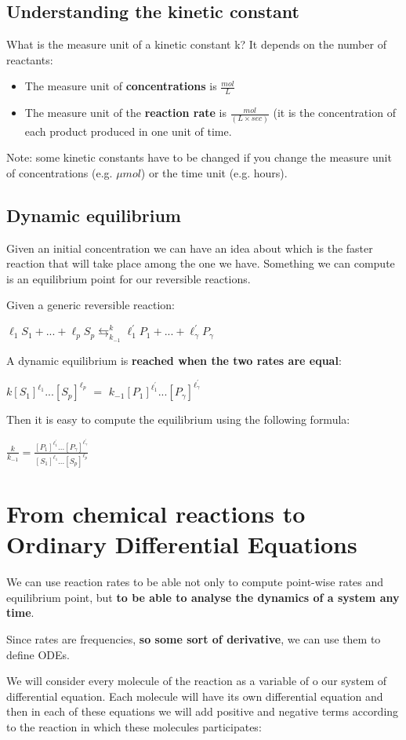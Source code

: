 \subsection{Understanding the kinetic constant}
What is the measure unit of a kinetic constant k?
It depends on the number of reactants:

\begin{itemize}
    \item The measure unit of \textbf{concentrations} is $\frac{mol}{L}$
    \item The measure unit of the \textbf{reaction rate} is $\frac{mol}{(L \times sec)}$ (it is the concentration of each product produced in one unit of time.
\end{itemize}
Note: some kinetic constants have to be changed if you change the measure unit of concentrations (e.g. $\mu mol$) or the time unit (e.g. hours).

\subsection{Dynamic equilibrium}
Given an initial concentration we can have an idea about which is the faster reaction that will take place among the one we have. Something we can compute is an equilibrium point for our reversible reactions. \par
Given a generic reversible reaction:
\begin{center}
    $\ell_1 S_1 + ... + \ell_p S_p \leftrightarrows^{k}_{k_{-1}} \ell^{'}_1 P_1 + ... + \ell^{'}_\gamma P_\gamma$
\end{center}
A dynamic equilibrium is \textbf{reached when the two rates are equal}:
\begin{center}
    $k[S_{1}]^{\ell_{1}} ... [S_{p}]^{\ell_{p}}$ $=$ $k_{-1}[P_{1}]^{\ell^{'}_{1}} ... [P_{\gamma}]^{\ell^{'}_{\gamma}}$
\end{center}

Then it is easy to compute the equilibrium using the following formula:
\begin{center}
    $\frac{k}{k_{-1}} = \frac{[P_{1}]^{\ell^{'}_{1}} ... [P_{\gamma}]^{\ell^{'}_{\gamma}}}{[S_{1}]^{\ell_{1}} ... [S_{p}]^{\ell_{p}}}$
\end{center}

\section{From chemical reactions to Ordinary Differential Equations}
We can use reaction rates to be able not only to compute point-wise rates and equilibrium point, but \textbf{to be able to analyse the dynamics of a system any time}.\par
Since rates are frequencies, \textbf{so some sort of derivative}, we can use them to define ODEs.\par
We will consider every molecule of the reaction as a variable of o our system of differential equation. Each molecule will have its own differential equation and then in each of these equations we will add positive and negative terms according to the reaction in which these molecules participates:

